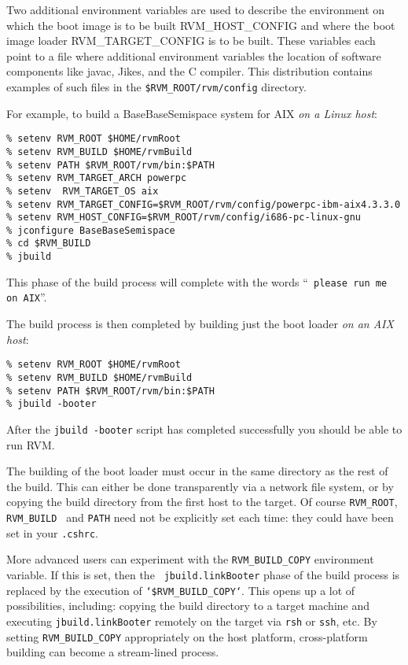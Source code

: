     Two additional environment variables are used to describe the 
environment on which the boot image is to be built RVM\_HOST\_CONFIG  and where
the boot image loader  RVM\_TARGET\_CONFIG is to be built. These variables
each point to a file where additional environment variables the location
of software components like javac, Jikes\trademark, and the C compiler. 
This distribution
contains examples of such files in the {\tt \$RVM\_ROOT/rvm/config} directory.   

For example, to build a BaseBaseSemispace system for AIX\AIXTMFootnote
{\em on a Linux host}:
\begin{verbatim}
% setenv RVM_ROOT $HOME/rvmRoot
% setenv RVM_BUILD $HOME/rvmBuild
% setenv PATH $RVM_ROOT/rvm/bin:$PATH
% setenv RVM_TARGET_ARCH powerpc
% setenv  RVM_TARGET_OS aix
% setenv RVM_TARGET_CONFIG=$RVM_ROOT/rvm/config/powerpc-ibm-aix4.3.3.0
% setenv RVM_HOST_CONFIG=$RVM_ROOT/rvm/config/i686-pc-linux-gnu
% jconfigure BaseBaseSemispace
% cd $RVM_BUILD
% jbuild
\end{verbatim}

This phase of the build process will complete with the words ``{\tt
  please run me on AIX}''.


The build process is then completed by building just the boot loader {\em
  on an AIX host}:

\begin{verbatim}
% setenv RVM_ROOT $HOME/rvmRoot
% setenv RVM_BUILD $HOME/rvmBuild
% setenv PATH $RVM_ROOT/rvm/bin:$PATH
% jbuild -booter
\end{verbatim}

After the {\tt jbuild -booter} script has completed successfully you should be able 
to run RVM. 

The building of the boot loader must occur in the same directory as
the rest of the build.  This can either be done transparently via a
network file system, or by copying the build directory from the first
host to the target.  Of course {\tt RVM\_ROOT}, {\tt RVM\_BUILD }
and {\tt PATH} need not be explicitly set each time: they could have
been set in your {\tt .cshrc}.

More advanced users can experiment with the {\tt RVM\_BUILD\_COPY}
environment variable.  If this is set, then the {\tt
  jbuild.linkBooter} phase of the build process is replaced by the
execution of {\tt `\$RVM\_BUILD\_COPY`}.  This opens up a lot of
possibilities, including: copying the build directory to a target
machine and executing {\tt jbuild.linkBooter} remotely on the target
via {\tt rsh} or {\tt ssh}, etc.  By setting {\tt RVM\_BUILD\_COPY}
appropriately on the host platform, cross-platform building can become
a stream-lined process.

